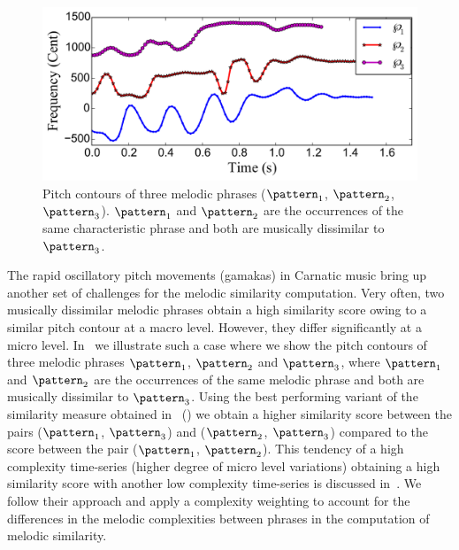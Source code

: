 \begin{figure}
	\begin{center}
		\includegraphics[width=\figSizeEightyFive]{ch06_patterns/figures/ImprovingSimilarity/CarnaticComplexityExample.pdf}
	\end{center}
	\caption[Illustration of an erroneous case of melodic similarity in Carnatic music]{Pitch contours of three melodic phrases ($\pattern_1$, $\pattern_2$, $\pattern_3$). $\pattern_1$ and $\pattern_2$ are the occurrences of the same characteristic phrase and both are musically dissimilar to $\pattern_3$.} 
	\label{fig:carnaticComplexityExample}
\end{figure}

The rapid oscillatory pitch movements (\glspl{gamaka}) in Carnatic music bring up another set of challenges for the melodic similarity computation. Very often, two musically dissimilar melodic phrases obtain a high similarity score owing to a similar pitch contour at a macro level. However, they differ significantly at a micro level. In~ we illustrate such a case where we show the pitch contours of three melodic phrases $\pattern_1$, $\pattern_2$ and $\pattern_3$, where $\pattern_1$ and $\pattern_2$ are the occurrences of the same melodic phrase and both are musically dissimilar to $\pattern_3$. Using the best performing variant of the similarity measure obtained in~ () we obtain a higher similarity score between the pairs ($\pattern_1$, $\pattern_3$) and ($\pattern_2$, $\pattern_3$) compared to the score between the pair ($\pattern_1$, $\pattern_2$). This tendency of a high complexity time-series (higher degree of micro level variations) obtaining a high similarity score with another low complexity time-series is discussed in~\cite{batista2011complexity}. We follow their approach and apply a complexity weighting to account for the differences in the melodic complexities between phrases in the computation of melodic similarity. 


